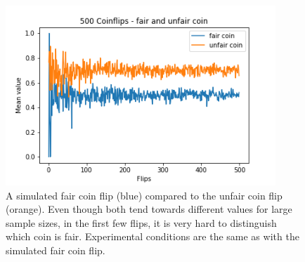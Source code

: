 \begin{figure}[h!]%
	\centering
	\includegraphics[width=4in]{img/05_1/unfair_coinflip.png}
	\caption[Fair and unfair coinflip comparison]
	{A simulated fair coin flip (blue) compared to the unfair coin flip (orange). Even though both tend towards different values for large sample sizes, in the first few flips, it is very hard to distinguish which coin is fair. Experimental conditions are the same as with the simulated fair coin flip.}
\end{figure}
